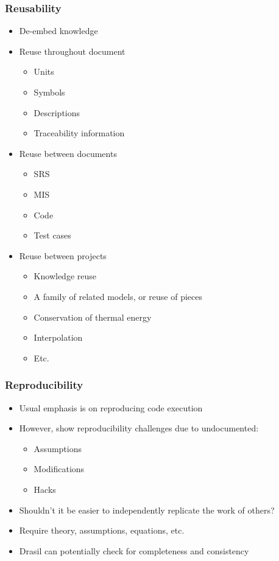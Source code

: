 \documentclass{beamer}
\begin{document}
\begin{frame}

\frametitle{Reusability}

\begin{itemize}
\item De-embed knowledge
\item Reuse throughout document
\begin{itemize}
\item Units
\item Symbols
\item Descriptions
\item Traceability information
\end{itemize}
\item Reuse between documents
\begin{itemize}
\item SRS
\item MIS
\item Code
\item Test cases
\end{itemize}
\item Reuse between projects
\begin{itemize}
\item Knowledge reuse
\item A family of related models, or reuse of pieces
\item Conservation of thermal energy
\item Interpolation
\item Etc.
\end{itemize}
\end{itemize}
\end{frame}


\begin{frame}

\frametitle{Reproducibility}

\begin{itemize}
\item Usual emphasis is on reproducing code execution
\item However, \cite{IonescuAndJansson2013} show reproducibility challenges due to
undocumented:
\begin{itemize}
\item Assumptions
\item Modifications
\item Hacks
\end{itemize}
\item Shouldn't it be easier to independently replicate the work of others?
\item Require theory, assumptions, equations, etc.
\item Drasil can potentially check for completeness and consistency
\end{itemize}

\end{frame}
\end{document}
